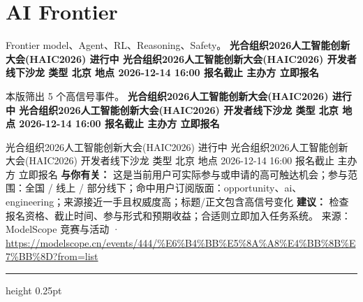 \documentclass[10.5pt]{ctexart}
\begin{document}
\section*{AI Frontier}
{\color{ormuted} Frontier model、Agent、RL、Reasoning、Safety。}
\vspace{2mm}
{\LARGE\bfseries 光合组织2026人工智能创新大会(HAIC2026) 进行中 光合组织2026人工智能创新大会(HAIC2026) 开发者线下沙龙 类型 北京 地点 2026-12-14 16:00 报名截止 主办方 立即报名}\par
\vspace{1mm}
{\color{ormuted} 本版筛出 5 个高信号事件。}
\vspace{3mm}
{\Large\bfseries 光合组织2026人工智能创新大会(HAIC2026) 进行中 光合组织2026人工智能创新大会(HAIC2026) 开发者线下沙龙 类型 北京 地点 2026-12-14 16:00 报名截止 主办方 立即报名}\par
光合组织2026人工智能创新大会(HAIC2026) 进行中 光合组织2026人工智能创新大会(HAIC2026) 开发者线下沙龙 类型 北京 地点 2026-12-14 16:00 报名截止 主办方 立即报名
\textbf{与你有关：} 这是当前用户可实际参与或申请的高可触达机会；参与范围：全国 / 线上 / 部分线下；命中用户订阅版面：opportunity、ai、engineering；来源接近一手且权威度高；标题/正文包含高信号变化
\textbf{建议：} 检查报名资格、截止时间、参与形式和预期收益；合适则立即加入任务系统。
{\footnotesize\color{ormuted} 来源：ModelScope 竞赛与活动 · \url{https://modelscope.cn/events/444/%E6%B4%BB%E5%8A%A8%E4%BB%8B%E7%BB%8D?from=list}}
\vspace{4mm}
\hrule height 0.25pt
\vspace{3mm}
\end{document}
